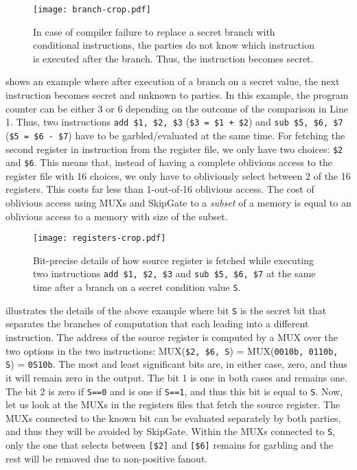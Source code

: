 \begin{figure}[h]
\centering
\texttt{[image: branch-crop.pdf]}
\caption{In case of compiler failure to replace a secret branch with conditional instructions, the parties do not know which instruction is executed after the branch.
Thus, the instruction becomes secret.}
\label{fig:branch}
\vspace{-5pt}
\end{figure}

 shows an example where after execution of a branch on a secret value, the next instruction becomes secret and unknown to parties.
In this example, the program counter can be either 3 or 6 depending on the outcome of the comparison in Line 1.
Thus, two instructions \texttt{add \$1, \$2, \$3} (\texttt{\$3 = \$1 + \$2}) and \texttt{sub \$5, \$6, \$7} (\texttt{\$5 = \$6 - \$7}) have to be garbled/evaluated at the same time.
For fetching the second register in instruction from the register file, we only have two choices: \texttt{\$2} and \texttt{\$6}.
This means that, instead of having a complete oblivious access to the register file with 16 choices, we only have to obliviously select between 2 of the 16 registers.
This costs far less than 1-out-of-16 oblivious access.
The cost of oblivious access using MUXs and SkipGate to a {\it subset} of a memory is equal to an oblivious access to a memory with size of the subset.

\begin{figure*}[ht]
\centering
\texttt{[image: registers-crop.pdf]}
\caption{Bit-precise details of how source register is fetched while executing two instructions \texttt{add \$1, \$2, \$3} and \texttt{sub \$5, \$6, \$7} at the same time after a branch on a secret condition value \texttt{S}.}
\label{fig:registers}
\end{figure*}

 illustrates the details of the above example where bit \texttt{S} is the secret bit that separates the branches of computation that each leading into a different instruction.
The address of the source register is computed by a MUX over the two options in the two instructions: MUX(\texttt{\$2, \$6, S}) = MUX(\texttt{0010b, 0110b, S}) = \texttt{0S10b}.
The most and least significant bits are, in either case, zero, and thus it will remain zero in the output.
The bit 1 is one in both cases and remains one.
The bit 2 is zero if \texttt{S==0} and is one if \texttt{S==1}, and thus this bit is equal to \texttt{S}.
Now, let us look at the MUXs in the registers files that fetch the source register.
The MUXs connected to the known bit can be evaluated separately by both parties, and thus they will be avoided by SkipGate.
Within the MUXs connected to \texttt{S}, only the one that selects between \texttt{[\$2]} and \texttt{[\$6]} remains for garbling and the rest will be removed due to non-positive fanout.

